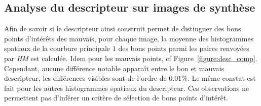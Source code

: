 \documentclass[
	a4paper, %
	10pt, %
	unnumberedsections, %
	twoside, %
]{LTJournalArticle}
\begin{document}
\subsection{Analyse du descripteur sur images de synthèse}

Afin de savoir si le descripteur ainsi construit permet de distinguer
des bons points d'intérêts des mauvais,
pour chaque image, la moyenne des histogrammes spatiaux de
la courbure principale $1$ des bons points parmi les paires
renvoyées par \textit{HM} est calculée. Idem pour les mauvais points, cf Figure~\ref{figure:desc_comp}.
Cependant, aucune différence notable apparaît entre le bon et mauvais descripteur,
les différences visibles sont de l'ordre de $0.01 \%$.
Le même constat est fait pour les autres histogrammes spatiaux du
descripteur. Ces observations ne
permettent pas d'inférer un critère de sélection de bons points d'intérêt.

\end{document}
